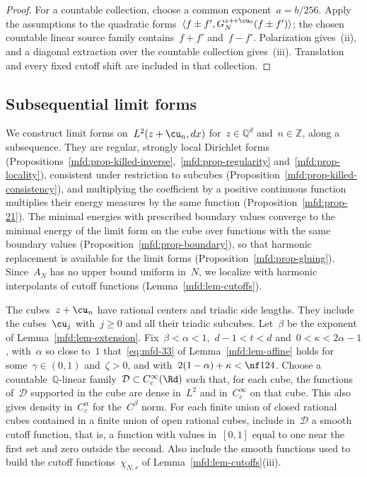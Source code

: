 \documentclass[11pt]{amsart}
\begin{document}
\begin{proof}
\smallskip

For a countable collection, choose a common exponent~$a=b/256$. Apply the assumptions to the quadratic forms~$\langle f\pm f',G_N^{z+r\cu_0}(f\pm f')\rangle$; the chosen countable linear source family contains~$f+f'$ and~$f-f'$. Polarization gives~(ii), and a diagonal extraction over the countable collection gives~(iii). Translation and every fixed cutoff shift are included in that collection.
\end{proof}

\subsection{Subsequential limit forms}
\label{mfd:sec-local-form}

We construct limit forms on~$L^2(z+\cu_n,dx)$ for~$z\in\mathbb Q^d$ and~$n\in\mathbb Z$, along a subsequence. They are regular, strongly local Dirichlet forms (Propositions~\ref{mfd:prop-killed-inverse},~\ref{mfd:prop-regularity} and~\ref{mfd:prop-locality}), consistent under restriction to subcubes (Proposition~\ref{mfd:prop-killed-consistency}), and multiplying the coefficient by a positive continuous function multiplies their energy measures by the same function (Proposition~\ref{mfd:prop-21}). The minimal energies with prescribed boundary values converge to the minimal energy of the limit form on the cube over functions with the same boundary values (Proposition~\ref{mfd:prop-boundary}), so that harmonic replacement is available for the limit forms (Proposition~\ref{mfd:prop-gluing}). Since~$A_N$ has no upper bound uniform in~$N$, we localize with harmonic interpolants of cutoff functions (Lemma~\ref{mfd:lem-cutoffs}).

\smallskip

The cubes~$z+\cu_n$ have rational centers and triadic side lengths. They include the cubes~$\cu_j$ with~$j\geq0$ and all their triadic subcubes. Let~$\beta$ be the exponent of Lemma~\ref{mfd:lem-extension}. Fix~$\beta<\alpha<1$,~$d-1<t<d$ and~$0<\kappa<2\alpha-1$, with~$\alpha$ so close to~$1$ that~\eqref{eq:mfd-33} of Lemma~\ref{mfd:lem-affine} holds for some~$\gamma\in(0,1)$ and~$\zeta>0$, and with~$2(1-\alpha)+\kappa<\nf1{24}$. Choose a countable~$\mathbb Q$-linear family~$\mathcal D\subset C_c^\infty(\Rd)$ such that, for each cube, the functions of~$\mathcal D$ supported in the cube are dense in~$L^2$ and in~$C_c^\infty$ on that cube. This also gives density in~$C^\alpha_c$ for the~$C^\beta$ norm. For each finite union of closed rational cubes contained in a finite union of open rational cubes, include in~$\mathcal D$ a smooth cutoff function, that is, a function with values in~$[0,1]$ equal to one near the first set and zero outside the second. Also include the smooth functions used to build the cutoff functions~$\chi_{N,r}$ of Lemma~\ref{mfd:lem-cutoffs}(iii).
\end{document}
